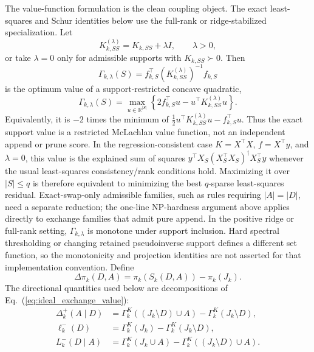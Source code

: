 \documentclass[
  reprint,
  amsmath,
  amssymb,
  aps,
  pra,
  nofootinbib,
  superscriptaddress,
  floatfix
]{revtex4-2}
\begin{document}
The value-function formulation is the clean coupling object.  The exact
least-squares and Schur identities below use the full-rank or ridge-stabilized
specialization.  Let
\[
K_{k,SS}^{(\lambda)}=K_{k,SS}+\lambda I,
\qquad
\lambda>0,
\]
or take \(\lambda=0\) only for admissible supports with \(K_{k,SS}\succ0\).
Then
\begin{equation}
\Gamma_{k,\lambda}(S)
=
f_{k,S}^{\top}
\left(K_{k,SS}^{(\lambda)}\right)^{-1}
f_{k,S}
\label{eq:exchange_gamma_ridge}
\end{equation}
is the optimum value of a support-restricted concave quadratic,
\begin{equation}
\Gamma_{k,\lambda}(S)
=
\max_{u\in\mathbb R^{|S|}}
\left\{
2f_{k,S}^{\top}u
-u^\top K_{k,SS}^{(\lambda)}u
\right\}.
\label{eq:exchange_gamma_value_function}
\end{equation}
Equivalently, it is \(-2\) times the minimum of
\(\frac12u^\top K_{k,SS}^{(\lambda)}u-f_{k,S}^{\top}u\).  Thus the exact
support value is a restricted McLachlan value function, not an independent
append or prune score.  In the regression-consistent case
\(K=X^\top X\), \(f=X^\top y\), and \(\lambda=0\), this value is the explained
sum of squares \(y^\top X_S(X_S^\top X_S)^\dagger X_S^\top y\) whenever the
usual least-squares consistency/rank conditions hold.  Maximizing it over
\(|S|\le q\) is therefore equivalent to minimizing the best \(q\)-sparse
least-squares residual.  Exact-swap-only admissible families, such as rules
requiring \(|A|=|D|\), need a separate reduction; the one-line NP-hardness
argument above applies directly to exchange families that admit pure append.
In the positive ridge or full-rank setting, \(\Gamma_{k,\lambda}\) is monotone
under support inclusion.  Hard spectral thresholding or changing retained
pseudoinverse support defines a different set function, so the monotonicity and
projection identities are not asserted for that implementation convention.
Define
\[
\Delta\pi_k(D,A)=\pi_k(S_k(D,A))-\pi_k(J_k).
\]
The directional quantities used below are decompositions of
Eq.~(\ref{eq:ideal_exchange_value}):
\begin{equation}
\begin{aligned}
\Delta_k^{+}(A\mid D)
&=
\Gamma_k^K((J_k\setminus D)\cup A)
-\Gamma_k^K(J_k\setminus D),\\
\ell_k^{-}(D)
&=
\Gamma_k^K(J_k)-\Gamma_k^K(J_k\setminus D),\\
L_k^{-}(D\mid A)
&=
\Gamma_k^K(J_k\cup A)
-\Gamma_k^K((J_k\setminus D)\cup A).
\end{aligned}
\label{eq:exchange_directional_decomposition}
\end{equation}
\end{document}
